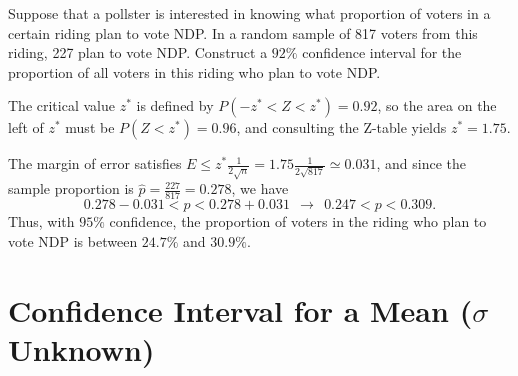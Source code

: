 \begin{examp}Suppose that a pollster is interested in knowing what proportion of voters in a certain riding plan to vote NDP. In a random sample of 817 voters from this riding, 227 plan to vote NDP. Construct a $92\%$ confidence interval for the proportion of all voters in this riding who plan to vote NDP.
\par
\noindent The critical value $z^*$ is defined by $P(-z^* < Z < z^*) = 0.92$, so the area on the left of $z^*$ must be $P(Z < z^*) = 0.96$, and consulting the Z-table yields $z^* = 1.75$.
\begin{center}
\end{center}
\noindent The margin of error satisfies $E \leq z^*  \frac{1}{2\sqrt{n}} = 1.75 \frac{1}{2\sqrt{817}} \simeq 0.031$, and since the sample proportion is $\widehat{p} = \frac{227}{817} = 0.278$, we have
$$0.278-0.031 < p < 0.278+0.031 \ \ \rightarrow \ \ 0.247 < p < 0.309.$$
\noindent Thus, with $95\%$ confidence, the proportion of voters in the riding who plan to vote NDP is between $24.7\%$ and $30.9\%$.
\end{examp}

\section{Confidence Interval for a Mean ($\sigma$ Unknown)}

